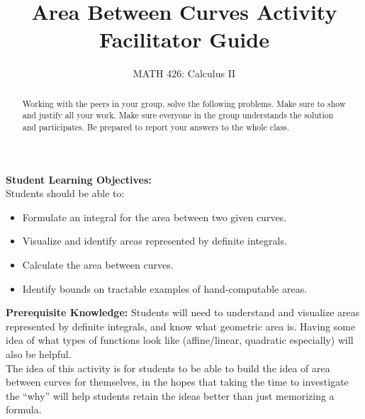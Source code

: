 \documentclass{ximera}
\title{Area Between Curves Activity Facilitator Guide}
\author{MATH 426: Calculus II}
\begin{document}
\begin{abstract}
   Working with the peers in your group, solve the following problems. Make sure to show and justify all your work. Make sure everyone in the group understands the solution and participates. Be prepared to report your answers to the whole class. 
\end{abstract}
\maketitle

\textbf{Student Learning Objectives:}\\
Students should be able to:
    \begin{itemize}
        \item Formulate an integral for the area between two given curves.
        \item Visualize and identify areas represented by definite integrals.
        \item Calculate the area between curves.
        \item Identify bounds on tractable examples of hand-computable areas.
    \end{itemize}

\textbf{Prerequisite Knowledge:} Students will need to understand and visualize areas represented by definite integrals, and know what geometric area is.  Having some idea of what types of functions look like (affine/linear, quadratic especially) will also be helpful.\\

The idea of this activity is for students to be able to build the idea of area between curves for themselves, in the hopes that taking the time to investigate the ``why'' will help students retain the ideas better than just memorizing a formula.
\end{document}
